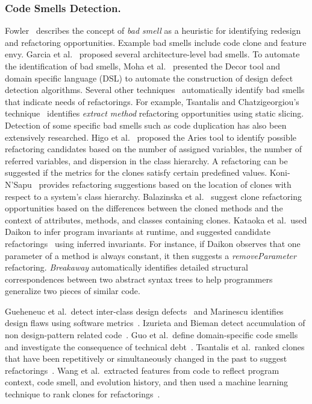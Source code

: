 \subsubsection{Code Smells Detection.} 
\label{sec:codesmell} 

Fowler~\cite{1999:RID} describes the concept of {\em bad smell} as a heuristic for identifying redesign and refactoring opportunities. Example bad smells include code clone and feature envy. Garcia et al.~\cite{Garcia2009:badsmell} proposed several architecture-level bad smells. To automate the identification of bad smells, Moha et al.~\cite{Moha2009:designdefect} presented the Decor tool and domain specific language (DSL) to automate the construction of design defect detection algorithms.  Several other techniques~\cite{Tsantalis2009:extractmethod,Tsantalis2009:movemethod,Tsantalis2008:jdeodorant} automatically identify bad smells that indicate needs of refactorings. For example, Tsantalis and Chatzigeorgiou's technique~\cite{Tsantalis2009:extractmethod} identifies {\em extract method} refactoring opportunities using static slicing. Detection of some specific bad smells such as code duplication has also been extensively researched. Higo et al.~\cite{Higo2004} proposed the Aries tool to identify possible refactoring candidates based on the number of assigned variables, the number of referred variables, and dispersion in the class hierarchy. A refactoring can be suggested if the metrics for the clones satisfy certain predefined values. Koni-N'Sapu~\cite{koni_nsapu:ms01} provides refactoring suggestions based on the location of clones with respect to a system's class hierarchy. Balazinska et al.~\cite{Balazinska2000:ACA} suggest clone refactoring opportunities based on the differences between the cloned methods and the context of attributes, methods, and classes containing clones. Kataoka et al.~used Daikon to infer program invariants at runtime, and suggested candidate refactorings~\cite{Kataoka2001:ASP} using inferred invariants. For instance, if Daikon observes that one parameter of a method is always constant, it then suggests a \emph{removeParameter} refactoring. 
{\it Breakaway} \cite{Cottrell:2007} automatically identifies detailed structural correspondences between two abstract syntax trees to help programmers generalize two pieces of similar code.

Gueheneuc et al.~detect inter-class design defects~\cite{Gueheneuc2001:designdefect} and Marinescu identifies design flaws using software metrics~\cite{Marinescu2004:designflaw}. Izurieta and Bieman detect accumulation of non design-pattern related code~\cite{Izurieta2007:grime}. Guo et al.~define domain-specific code smells~\cite{Guo2010:smell} and investigate the consequence of technical debt~\cite{Guo2011:td}. Tsantalis et al.~ranked clones that have been repetitively or simultaneously changed in the past to suggest refactorings~\cite{Tsantalis2011:rankRefactoring}. Wang et al.~extracted features from code to reflect program context, code smell, and evolution history, and then used a machine learning technique to rank clones for refactorings~\cite{Wang2014:recommendClones}.

